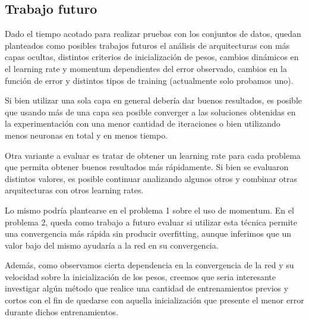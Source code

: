 \documentclass[informe.tex]{subfiles}
\begin{document}
    \subsection{Trabajo futuro}
    
      Dado el tiempo acotado para realizar pruebas con los conjuntos de datos, quedan planteados como posibles trabajos futuros el an\'alisis de arquitecturas con más capas ocultas, distintos criterios de inicializaci\'on de pesos, cambios din\'amicos en el learning rate y momentum dependientes del error observado, cambios en la funci\'on de error y distintos tipos de training (actualmente solo probamos uno).
      
      Si bien utilizar una sola capa en general debería dar buenos resultados, es posible que usando más de una capa sea posible converger a las soluciones obtenidas en la experimentación con una menor cantidad de iteraciones o bien utilizando menos neuronas en total y en menos tiempo.
      
      Otra variante a evaluar es tratar de obtener un learning rate para cada problema que permita obtener buenos resultados m\'as r\'apidamente. Si bien se evaluaron distintos valores, es posible continuar analizando algunos otros y combinar otras arquitecturas con otros learning rates.
      
      Lo mismo podría plantearse en el problema 1 sobre el uso de momentum. En el problema 2, queda como trabajo a futuro evaluar si utilizar esta técnica permite una convergencia más rápida sin producir overfitting, aunque inferimos que un valor bajo del mismo ayudar\'ia a la red en su convergencia.
      
      Adem\'as, como observamos cierta dependencia en la convergencia de la red y su velocidad sobre la inicializaci\'on de los pesos, creemos que seria interesante investigar alg\'un m\'etodo que realice una cantidad de entrenamientos previos y cortos con el fin de quedarse con aquella inicializaci\'on que presente el menor error durante dichos entrenamientos.
\end{document}
